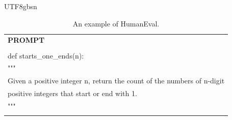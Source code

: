 \documentclass[11pt, a4paper, logo, copyright, nonumbering]{deepseek}
\begin{document}
\begin{CJK*}{UTF8}{gbsn}
\begin{table}[ht]
    \centering \small
\begin{tabular}{p{12cm}}
\toprule
\textbf{PROMPT}\\
\\def starts\_one\_ends(n):
\\    """
\\    Given a positive integer n, return the count of the numbers of n-digit
\\    positive integers that start or end with 1.
\\    """
\\\\
\bottomrule
\end{tabular}
    \caption{\centering An example of HumanEval.}
    \label{tab:humaneval_eval_format_example}
\end{table}


\end{CJK*}
\end{document}
